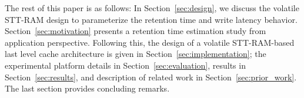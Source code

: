 

The rest of this paper is as follows: In Section~\ref{sec:design}, we discuss the volatile STT-RAM design to
parameterize the retention time and write latency behavior. Section~\ref{sec:motivation} presents a retention time
estimation study from application perspective. Following this, the design of a volatile STT-RAM-based last
level cache architecture is given in Section~\ref{sec:implementation}; the experimental platform details in Section~\ref{sec:evaluation},
results in Section~\ref{sec:results}, and description of related work in Section~\ref{sec:prior_work}.
The last section provides concluding remarks.



